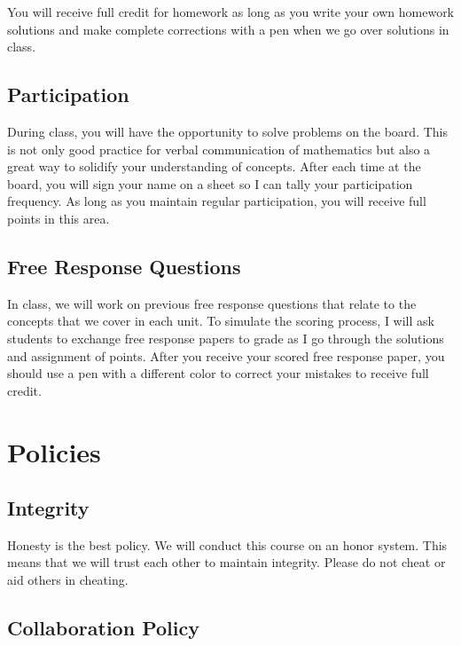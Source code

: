\documentclass[12pt,fleqn]{article}
\begin{document}
You will receive full credit for homework as long as you write your own homework solutions and make complete corrections with a pen when we go over solutions in class.

\hypertarget{participation}{%
\subsection{Participation}\label{participation}}

During class, you will have the opportunity to solve problems on the board. This is not only good practice for verbal communication of mathematics but also a great way to solidify your understanding of concepts. After each time at the board, you will sign your name on a sheet so I can tally your participation frequency. As long as you maintain regular participation, you will receive full points in this area.

\hypertarget{free-response-questions}{%
\subsection{Free Response Questions}\label{free-response-questions}}

In class, we will work on previous free response questions that relate to the concepts that we cover in each unit. To simulate the scoring process, I will ask students to exchange free response papers to grade as I go through the solutions and assignment of points. After you receive your scored free response paper, you should use a pen with a different color to correct your mistakes to receive full credit.

\hypertarget{policies}{%
\section{Policies}\label{policies}}

\hypertarget{integrity}{%
\subsection{Integrity}\label{integrity}}

Honesty is the best policy. We will conduct this course on an honor system. This means that we will trust each other to maintain integrity. Please do not cheat or aid others in cheating.

\hypertarget{collaboration-policy}{%
\subsection{Collaboration Policy}\label{collaboration-policy}}
\end{document}
